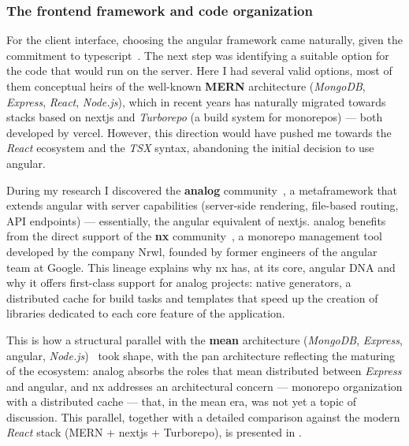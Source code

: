 \subsubsection*{The frontend framework and code organization}

For the client interface, choosing the \gls{angular} framework came naturally, given the commitment to \gls{typescript}~\cite{angular_signals}.
The next step was identifying a suitable option for the code that would run on the server.
Here I had several valid options, most of them conceptual heirs of the well-known \textbf{MERN} architecture (\textit{MongoDB}, \textit{Express}, \textit{React}, \textit{Node.js}), which in recent years has naturally migrated towards stacks based on \gls{nextjs} and \textit{Turborepo} (a build system for \glspl{monorepo}) --- both developed by \gls{vercel}.
However, this direction would have pushed me towards the \textit{React} ecosystem and the \textit{TSX} syntax, abandoning the initial decision to use \gls{angular}.

During my research I discovered the \textbf{\gls{analog}} community~\cite{analog}, a \gls{metaframework} that extends \gls{angular} with server capabilities (server-side rendering, file-based routing, API endpoints) --- essentially, the \gls{angular} equivalent of \gls{nextjs}.
\gls{analog} benefits from the direct support of the \textbf{\gls{nx}} community~\cite{nx}, a \gls{monorepo} management tool developed by the company Nrwl, founded by former engineers of the \gls{angular} team at Google.
This lineage explains why \gls{nx} has, at its core, \gls{angular} DNA and why it offers first-class support for \gls{analog} projects: native generators, a distributed cache for build tasks and templates that speed up the creation of libraries dedicated to each core feature of the application.

This is how a structural parallel with the \textbf{\gls{mean}} architecture (\textit{MongoDB}, \textit{Express}, \gls{angular}, \textit{Node.js})~\cite{karpovMean2013} took shape, with the \gls{pan} architecture reflecting the maturing of the ecosystem: \gls{analog} absorbs the roles that \gls{mean} distributed between \textit{Express} and \gls{angular}, and \gls{nx} addresses an architectural concern --- \gls{monorepo} organization with a distributed cache --- that, in the \gls{mean} era, was not yet a topic of discussion.
This parallel, together with a detailed comparison against the modern \textit{React} stack (MERN + \gls{nextjs} + Turborepo), is presented in .

